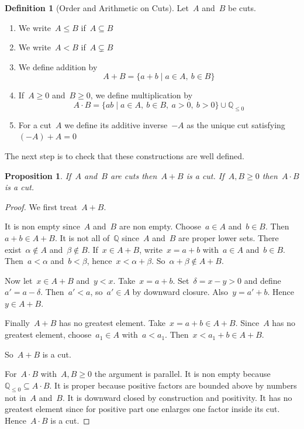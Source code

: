 \documentclass[12pt,a4paper,draft]{article}  %
\newtheorem{proposition}{Proposition}[section]
\theoremstyle{definition}
\newtheorem{definition}{Definition}[section]
\numberwithin{equation}{section}
\begin{document}
\begin{definition}[Order and Arithmetic on Cuts]
Let~$A$ and~$B$ be cuts.

\begin{enumerate}
\item We write~$A \le B$ if~$A \subseteq B$
\item We write~$A < B$ if~$A \subsetneq B$
\item We define addition by
\[
A+B
=
\{a+b \mid a\in A,\ b\in B\}
\]
\item If~$A \ge 0$ and~$B \ge 0$, we define multiplication by
\[
A\cdot B
=
\{ab \mid a\in A,\ b\in B,\ a>0,\ b>0\}\cup\mathbb{Q}_{\le0}
\]
\item For a cut~$A$ we define its additive inverse~$-A$ as the unique cut satisfying~$(-A)+A=0$
\end{enumerate}
\end{definition}

The next step is to check that these constructions are well defined.

\begin{proposition}
If~$A$ and~$B$ are cuts then~$A+B$ is a cut.
If~$A,B\ge0$ then~$A\cdot B$ is a cut.
\end{proposition}

\begin{proof}
We first treat~$A+B$.

It is non empty since~$A$ and~$B$ are non empty.
Choose~$a\in A$ and~$b\in B$.
Then~$a+b\in A+B$.
It is not all of~$\mathbb{Q}$ since~$A$ and~$B$ are proper lower sets.
There exist~$\alpha\notin A$ and~$\beta\notin B$.
If~$x\in A+B$, write~$x=a+b$ with~$a\in A$ and~$b\in B$.
Then~$a<\alpha$ and~$b<\beta$, hence~$x<\alpha+\beta$.
So~$\alpha+\beta\notin A+B$.

Now let~$x\in A+B$ and~$y<x$.
Take~$x=a+b$.
Set~$\delta=x-y>0$ and define~$a'=a-\delta$.
Then~$a'<a$, so~$a'\in A$ by downward closure.
Also~$y=a'+b$.
Hence~$y\in A+B$.

Finally~$A+B$ has no greatest element.
Take~$x=a+b\in A+B$.
Since~$A$ has no greatest element, choose~$a_1\in A$ with~$a<a_1$.
Then~$x<a_1+b\in A+B$.

So~$A+B$ is a cut.

For~$A\cdot B$ with~$A,B\ge0$ the argument is parallel.
It is non empty because~$\mathbb{Q}_{\le0}\subseteq A\cdot B$.
It is proper because positive factors are bounded above by numbers not in~$A$ and~$B$.
It is downward closed by construction and positivity.
It has no greatest element since for positive part one enlarges one factor inside its cut.
Hence~$A\cdot B$ is a cut.
\end{proof}
\end{document}
